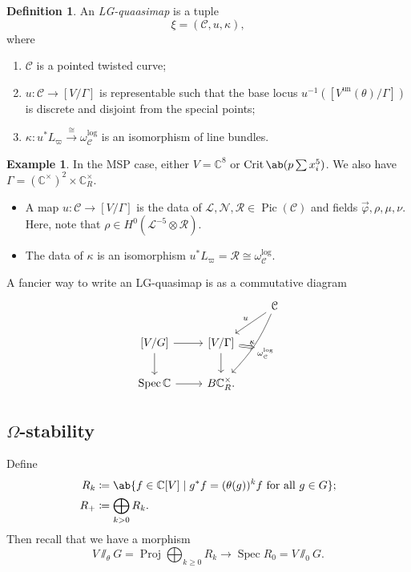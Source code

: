\documentclass[10pt]{amsart}
\theoremstyle{definition}
\newtheorem{defn}[thm]{Definition}
\newtheorem{exm}[thm]{Example}
\theoremstyle{remark}
\theoremstyle{plain}
\theoremstyle{definition}
\theoremstyle{remark}
\newcommand{\C}{\mathbb{C}}
\newcommand{\mc}[1]{\mathcal{#1}}
\newcommand{\mr}[1]{\mathrm{#1}}
\newcommand{\on}[1]{\operatorname{#1}}
\newcommand{\1}{\mathbf{1}}
\newcommand{\2}{\mathbf{2}}
\newcommand{\3}{\mathbf{3}}
\DeclareMathOperator{\Pic}{Pic}
\DeclareMathOperator{\Spec}{Spec}
\DeclareMathOperator{\Proj}{Proj}
\begin{document}
\begin{defn}
    An \textit{LG-quaasimap} is a tuple
    \[ \xi = (\mc{C}, u, \kappa), \]
    where
    \begin{enumerate}
        \item $\mc{C}$ is a pointed twisted curve;
        \item $u \colon \mc{C} \to [V/\Gamma]$ is representable such that the base locus $u^{-1}([V^{\mr{un}}(\theta)/\Gamma])$ is discrete and disjoint from the special points;
        \item $\kappa \colon u^* L_{\varpi} \xrightarrow{\cong} \omega_{\mc{C}}^{\log}$ is an isomorphism of line bundles.
    \end{enumerate}
\end{defn}

\begin{exm}
    In the MSP case, either $V = \C^8$ or $\on{Crit} \ab(p \sum x_i^5)$. We also have $\Gamma = (\C^{\times})^2 \times \C^{\times}_R$.
    \begin{itemize}
        \item A map $u \colon \mc{C} \to [V/\Gamma]$ is the data of $\mc{L}, \mc{N}, \mc{R} \in \Pic(\mc{C})$ and fields $\vec{ \varphi }, \rho, \mu, \nu$. Here, note that $\rho \in H^0(\mc{L}^{-5} \otimes \mc{R})$.
        \item The data of $\kappa$ is an isomorphism $u^* L_{\varpi} = \mc{R} \cong \omega_{\mc{C}}^{\log}$.
    \end{itemize}
\end{exm}

A fancier way to write an LG-quasimap is as a commutative diagram
\begin{equation*}
\begin{tikzcd}
    & & \mc{C} \ar[swap]{dl}{u} \ar[bend left=10,""{name=F}]{ddl}{\omega_{\mc{C}}^{\log}} \\
    { [V/G] } \ar{r} \ar{d} & { [V/\Gamma] } \ar{d} \ar[Rightarrow,to=F,"\kappa"]  \\
    \Spec \C \ar{r} & B \C^{\times}_R.
\end{tikzcd}
\end{equation*}

\subsection{$\Omega$-stability}%
\label{sub:Omega-stability}

Define
\begin{align*}
    R_k &\coloneqq \ab\{ f \in \C[V] \mid g^* f = (\theta(g))^k f\text{ for all } g \in G \};\\
    R_+ &\coloneqq \bigoplus_{k >0} R_k.
\end{align*}
Then recall that we have a morphism
\[ V \sslash_{\theta} G = \Proj \bigoplus_{k \geq 0} R_k \to \Spec R_0 = V \sslash_0 G. \]
\end{document}
